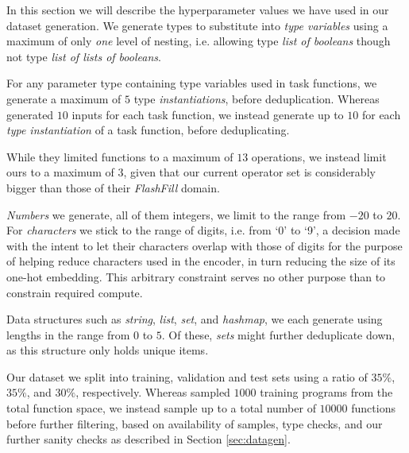 \documentclass{article}
\begin{document}
In this section we will describe the hyperparameter values we have used in our dataset generation.
We generate types to substitute into \emph{type variables} using a maximum of only \emph{one} level of nesting,
i.e. allowing type \emph{list of booleans} though not type \emph{list of lists of booleans}.

For any parameter type containing type variables used in task functions,
we generate a maximum of $5$ type \emph{instantiations}, before deduplication.
Whereas \citet{nsps} generated $10$ inputs for each task function,
we instead generate up to $10$ for each \emph{type instantiation} of a task function, before deduplicating.

While they limited functions to a maximum of $13$ operations,
we instead limit ours to a maximum of $3$,
given that our current operator set is considerably bigger than those of their \emph{FlashFill} domain.

\emph{Numbers} we generate, all of them integers,
we limit to the range from $-20$ to $20$.
For \emph{characters} we stick to the range of digits, i.e. from `0' to `9',
a decision made with the intent to let their characters overlap
with those of digits for the purpose of helping reduce characters used in the encoder,
in turn reducing the size of its one-hot embedding.
This arbitrary constraint serves no other purpose than to constrain required compute.

Data structures such as \emph{string}, \emph{list}, \emph{set}, and \emph{hashmap},
we each generate using lengths in the range from $0$ to $5$.
Of these, \emph{sets} might further deduplicate down,
as this structure only holds unique items.

Our dataset we split into training, validation and test sets
using a ratio of $35\%$, $35\%$, and $30\%$, respectively.
Whereas \citet{nsps} sampled $1000$ training programs from the total function space,
we instead sample up to a total number of $10000$ functions before further filtering,
based on availability of samples, type checks,
and our further sanity checks as described in Section \ref{sec:datagen}.
\end{document}

